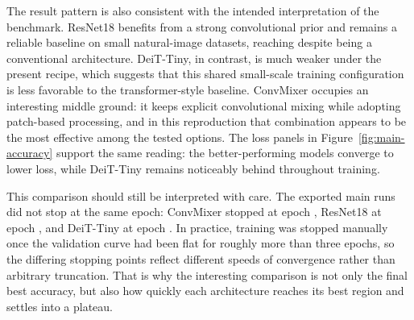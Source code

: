 The result pattern is also consistent with the intended interpretation of the benchmark. ResNet18 benefits from a strong convolutional prior and remains a reliable baseline on small natural-image datasets, reaching \resnetacc{} despite being a conventional architecture. DeiT-Tiny, in contrast, is much weaker under the present recipe, which suggests that this shared small-scale training configuration is less favorable to the transformer-style baseline. ConvMixer occupies an interesting middle ground: it keeps explicit convolutional mixing while adopting patch-based processing, and in this reproduction that combination appears to be the most effective among the tested options. The loss panels in Figure~\ref{fig:main-accuracy} support the same reading: the better-performing models converge to lower loss, while DeiT-Tiny remains noticeably behind throughout training.

This comparison should still be interpreted with care. The exported main runs did not stop at the same epoch: ConvMixer stopped at epoch \convmixerepochs, ResNet18 at epoch \resnetepochs, and DeiT-Tiny at epoch \deitepochs. In practice, training was stopped manually once the validation curve had been flat for roughly more than three epochs, so the differing stopping points reflect different speeds of convergence rather than arbitrary truncation. That is why the interesting comparison is not only the final best accuracy, but also how quickly each architecture reaches its best region and settles into a plateau.
